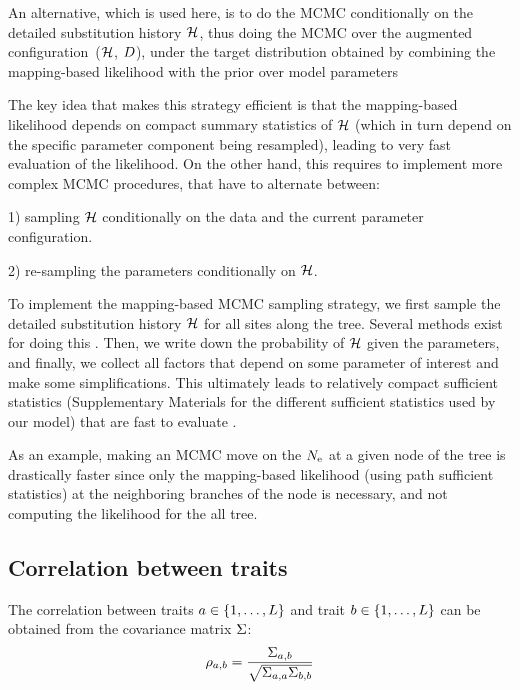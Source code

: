 An alternative, which is used here, is to do the \acrshort{MCMC} conditionally on the detailed \gls{substitution} history $\mathcal{H}$, thus doing the \acrshort{MCMC} over the augmented configuration~($\mathcal{H}$, $D$), under the target distribution obtained by combining the mapping-based \gls{likelihood} with the \gls{prior} over model parameters

The key idea that makes this strategy efficient is that the mapping-based \gls{likelihood} depends on
compact summary statistics of $\mathcal{H}$ (which in turn depend on the specific parameter component
being resampled), leading to very fast evaluation of the \gls{likelihood}.
On the other hand, this requires to implement more complex \acrshort{MCMC} procedures, that have to alternate between:

1) sampling $\mathcal{H}$ conditionally on the data and the current parameter configuration.

2) re-sampling the parameters conditionally on $\mathcal{H}$.

To implement the mapping-based \acrshort{MCMC} sampling strategy, we first sample the detailed \gls{substitution} history $\mathcal{H}$ for all sites along the tree.
Several methods exist for doing this \citep{Nielsen2002,Rodrigue2008}.
Then, we write down the probability of $\mathcal{H}$ given the parameters, and finally, we collect all factors that depend on some parameter of interest and make some simplifications.
This ultimately leads to relatively compact sufficient statistics (Supplementary Materials for the different sufficient statistics used by our model) that are fast to evaluate \citep{Irvahn2014,Davydov2016}.

As an example, making an \acrshort{MCMC} move on the $N_{\mathrm{e}}$ at a given node of the tree is drastically faster since only the mapping-based \gls{likelihood} (using path sufficient statistics) at the neighboring branches of the node is necessary, and not computing the \gls{likelihood} for the all tree.
\\

\subsection{Correlation between traits}
\label{sec:Correlation}
The correlation between traits $a \in \{1, \hdots, L\}$ and trait $b \in \{1, \hdots, L\}$ can be obtained from the covariance matrix $\Sigma$:
\begin{equation}
\rho_{a, b} = \dfrac{\Sigma_{a, b}}{\sqrt{\Sigma_{a, a} \Sigma_{b, b}}}
\end{equation}


